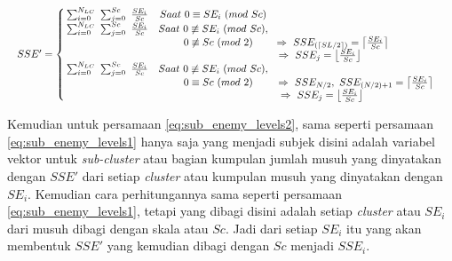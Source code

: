 \begin{equation}\label{eq:sub_enemy_levels2}
\resizebox{\columnwidth}{!}{%
	$SSE' = \left\{\begin{matrix}
	\hspace{0.2em} \sum_{i = 0}^{N_{LC}}\ \sum_{j = 0}^{Sc}\ \frac{SE_{i}}{Sc} & Saat\ 0 \equiv SE_{i}\ (mod\ Sc) & \\
	
	\hspace{0.2em} \sum_{i = 0}^{N_{LC}}\ \sum_{j = 0}^{Sc}\ \frac{SE_{i}}{Sc} & Saat\ 0 \not\equiv SE_{i}\ (mod\ Sc), & \\
	&\hspace{1.0em}  0 \not\equiv Sc\ (mod\ 2) & \hspace{-4.5em} \Rightarrow\ SSE_{(\left \lceil SL/2 \right \rceil)}  = \left \lceil \frac{SE_{i}}{Sc} \right \rceil &\\
	
	& & \hspace{-7.0em} \Rightarrow\ SSE_{j}  = \left \lfloor \frac{SE_{i}}{Sc} \right \rfloor &\\
	
	\hspace{0.2em} \sum_{i = 0}^{N_{LC}}\ \sum_{j = 0}^{Sc}\ \frac{SE_{i}}{Sc} & Saat\ 0 \not\equiv SE_{i}\ (mod\ Sc), & \\
	&\hspace{1.0em}  0 \equiv Sc\ (mod\ 2) & \Rightarrow\ SSE_{N/2},\ SSE_{(N/2) + 1}  = \left \lceil \frac{SE_{i}}{Sc} \right \rceil &\\
	
	& & \hspace{-6.6em} \Rightarrow\ SSE_{j}  = \left \lfloor \frac{SE_{i}}{Sc} \right \rfloor &\\
	\end{matrix}\right.$%
}
\end{equation}

Kemudian untuk persamaan \ref{eq:sub_enemy_levels2}, sama seperti persamaan \ref{eq:sub_enemy_levels1} hanya saja yang menjadi subjek disini adalah variabel vektor untuk \textit{sub-cluster} atau bagian kumpulan jumlah musuh yang dinyatakan dengan $SSE'$ dari setiap \textit{cluster} atau kumpulan musuh yang dinyatakan dengan $SE_{i}$. Kemudian cara perhitungannya sama seperti persamaan \ref{eq:sub_enemy_levels1}, tetapi yang dibagi disini adalah setiap \textit{cluster} atau $SE_{i}$ dari musuh dibagi dengan skala atau $Sc$. Jadi dari setiap $SE_{i}$ itu yang akan membentuk $SSE'$ yang kemudian dibagi dengan $Sc$ menjadi $SSE_{i}$.
\vspace{1ex}

